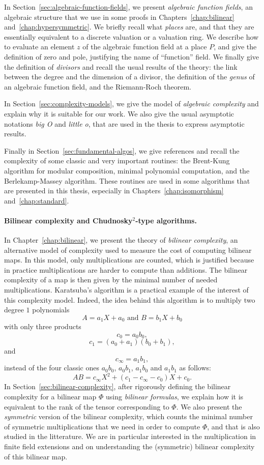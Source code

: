 In Section~\ref{sec:algebraic-function-fields}, we present \emph{algebraic
function fields}, an algebraic structure that we use in some proofs in
Chapters~\ref{chap:bilinear} and~\ref{chap:hypersymmetric}. We briefly recall
what \emph{places} are, and that they are essentially equivalent to a discrete
valuation or a valuation ring. We describe how to evaluate an element
$z$ of the algebraic function field at a place $P$, and give the definition of
zero and pole, justifying the name of ``function'' field. We finally give the
definition of \emph{divisors} and recall the usual results of the theory: the
link between the degree and the dimension of a divisor, the definition of the
\emph{genus} of an algebraic function field, and the Riemann-Roch theorem.

In Section~\ref{sec:complexity-models}, we give the model of \emph{algebraic
complexity} and explain why it is suitable for our work. We also give the usual
asymptotic notations \emph{big O} and \emph{little o}, that are used in the
thesis to express asymptotic results.

Finally in Section~\ref{sec:fundamental-algos}, we give references and recall
the complexity of some classic and very important routines: the Brent-Kung
algorithm for modular composition, minimal polynomial computation, and the
Berlekamp-Massey algorithm. These routines are used in some
algorithms that are presented in this thesis, especially
in Chapters~\ref{chap:isomorphism} and~\ref{chap:standard}.

\paragraph{Bilinear complexity and Chudnosky$^2$-type algorithms.} In
Chapter~\ref{chap:bilinear}, we present the theory of \emph{bilinear
complexity}, an alternative model of complexity used to measure the cost of
computing bilinear maps. In this model, only multiplications are counted, which
is justified because in practice multiplications are harder to compute than
additions. The bilinear complexity of a map is then given by the minimal number
of needed multiplications. Karatsuba's algorithm is a practical example of the
interest of this complexity model. Indeed, the idea behind this algorithm is to
multiply two degree $1$ polynomials
\[
  A = a_1 X + a_0\text{ and }B = b_1 X + b_0
\]
with only three products
\[
  c_0 = a_0b_0,
\]
\[
  c_1 = (a_0+a_1)(b_0+b_1),
\]
and
\[
  c_\infty = a_1b_1,
\]
instead
of the four classic ones $a_0b_0$, $a_0b_1$, $a_1b_0$ and $a_1b_1$ as follows:
\[
  AB = c_\infty X^2 + (c_1-c_\infty-c_0) X + c_0.
\]
In Section~\ref{sec:bilinear-complexity}, after rigorously defining the bilinear
complexity for a bilinear map $\Phi$ using \emph{bilinear formulas}, we explain
how it is equivalent to the rank of the tensor corresponding to $\Phi$. We also
present the \emph{symmetric} version of the bilinear complexity, which counts
the minimal number of symmetric multiplications that we need in order to compute
$\Phi$, and that is also studied in the litterature. We are in particular
interested in the multiplication in finite field extensions and on understanding
the (symmetric) bilinear complexity of this bilinear map.

